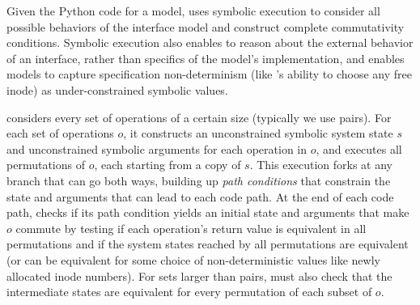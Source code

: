 Given the Python code for a model, \analyzer uses symbolic execution to
consider all possible behaviors of the interface model and construct
complete commutativity conditions.  Symbolic execution also enables
\analyzer to reason about the external behavior of an interface, rather
than specifics of the model's implementation, and enables models to
capture specification non-determinism (like 's ability to
choose any free inode) as under-constrained symbolic values.

\analyzer considers every set of operations of a certain size (typically
we use pairs).  For each set of operations $o$, it constructs an
unconstrained symbolic system state $s$ and unconstrained
symbolic arguments
for each operation in $o$, and executes all permutations
of $o$, each starting from a copy of $s$.
This execution forks at any branch that can go both
ways, building up \emph{path conditions} that constrain the state and
arguments that can lead to each code path.
At the end of each code path, \analyzer checks if its path condition
yields an initial state and arguments that make $o$ commute by testing if each
operation's return value is
equivalent in all permutations and if the system states reached by all
permutations are equivalent (or can be equivalent for some
choice of non-deterministic values like newly allocated
inode numbers).
%
For sets larger than pairs, \analyzer must also check that the
intermediate states are equivalent for every permutation of each subset
of $o$.
%



